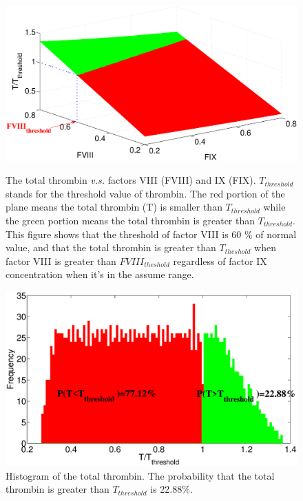 \begin{figure}
\begin{center}
  \includegraphics[width=5in]{figures/F89.eps}
\caption{The total thrombin \textit{v.s.} factors VIII (FVIII) and
IX (FIX). $T_{threshold}$ stands for the threshold  value of
thrombin. The red portion of the plane means the total thrombin (T)
is smaller than $T_{threshold}$ while the green portion means the
total thrombin is greater than $T_{threshold}$. This figure shows
that the threshold of factor VIII is 60 \% of normal value, and that
the total thrombin is greater than $T_{theshold}$ when factor VIII
is greater than $FVIII_{theshold}$ regardless of factor IX
concentration when it's in the assume range.}\label{Fig:F89}

  \includegraphics[width=5in]{figures/F89hist.eps}
\caption{Histogram of the total thrombin. The probability that the
total thrombin is greater than $T_{threshold}$ is
22.88\%.}\label{Fig:F89hist}


\end{center}
\end{figure}
